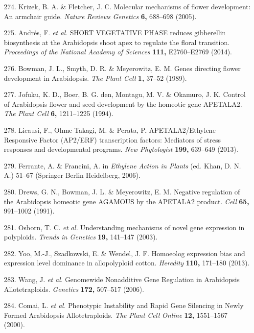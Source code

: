 \documentclass[12pt,]{book}
\begin{document}
\hypertarget{ref-krizek_molecular_2005}{}
274. Krizek, B. A. \& Fletcher, J. C. Molecular mechanisms of flower
development: An armchair guide. \emph{Nature Reviews Genetics}
\textbf{6,} 688--698 (2005).

\hypertarget{ref-andres_short_2014}{}
275. Andrés, F. \emph{et al.} SHORT VEGETATIVE PHASE reduces gibberellin
biosynthesis at the Arabidopsis shoot apex to regulate the floral
transition. \emph{Proceedings of the National Academy of Sciences}
\textbf{111,} E2760--E2769 (2014).

\hypertarget{ref-bowman_genes_1989}{}
276. Bowman, J. L., Smyth, D. R. \& Meyerowitz, E. M. Genes directing
flower development in Arabidopsis. \emph{The Plant Cell} \textbf{1,}
37--52 (1989).

\hypertarget{ref-jofuku_ap2_1994}{}
277. Jofuku, K. D., Boer, B. G. den, Montagu, M. V. \& Okamuro, J. K.
Control of Arabidopsis flower and seed development by the homeotic gene
APETALA2. \emph{The Plant Cell} \textbf{6,} 1211--1225 (1994).

\hypertarget{ref-licausi_ap2erf_2013}{}
278. Licausi, F., Ohme-Takagi, M. \& Perata, P. APETALA2/Ethylene
Responsive Factor (AP2/ERF) transcription factors: Mediators of stress
responses and developmental programs. \emph{New Phytologist}
\textbf{199,} 639--649 (2013).

\hypertarget{ref-ferrante_ethylene_2006}{}
279. Ferrante, A. \& Francini, A. in \emph{Ethylene Action in Plants}
(ed. Khan, D. N. A.) 51--67 (Springer Berlin Heidelberg, 2006).

\hypertarget{ref-drews_negative_1991}{}
280. Drews, G. N., Bowman, J. L. \& Meyerowitz, E. M. Negative
regulation of the Arabidopsis homeotic gene AGAMOUS by the APETALA2
product. \emph{Cell} \textbf{65,} 991--1002 (1991).

\hypertarget{ref-osborn_understanding_2003}{}
281. Osborn, T. C. \emph{et al.} Understanding mechanisms of novel gene
expression in polyploids. \emph{Trends in Genetics} \textbf{19,}
141--147 (2003).

\hypertarget{ref-yoo_homoeolog_2013}{}
282. Yoo, M.-J., Szadkowski, E. \& Wendel, J. F. Homoeolog expression
bias and expression level dominance in allopolyploid cotton.
\emph{Heredity} \textbf{110,} 171--180 (2013).

\hypertarget{ref-wang_genomewide_2006}{}
283. Wang, J. \emph{et al.} Genomewide Nonadditive Gene Regulation in
Arabidopsis Allotetraploids. \emph{Genetics} \textbf{172,} 507--517
(2006).

\hypertarget{ref-comai_phenotypic_2000}{}
284. Comai, L. \emph{et al.} Phenotypic Instability and Rapid Gene
Silencing in Newly Formed Arabidopsis Allotetraploids. \emph{The Plant
Cell Online} \textbf{12,} 1551--1567 (2000).
\end{document}
